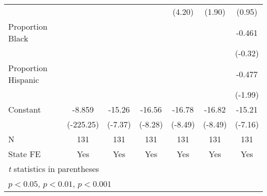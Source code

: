 {\begin{tabular}{l*{6}{c}}
                    &                     &                     &                     &      (4.20)         &      (1.90)         &      (0.95)         \\
\addlinespace
Proportion Black    &                     &                     &                     &                     &                     &      -0.461         \\
                    &                     &                     &                     &                     &                     &     (-0.32)         \\
\addlinespace
Proportion Hispanic &                     &                     &                     &                     &                     &      -0.477\sym{*}  \\
                    &                     &                     &                     &                     &                     &     (-1.99)         \\
\addlinespace
Constant            &      -8.859\sym{***}&      -15.26\sym{***}&      -16.56\sym{***}&      -16.78\sym{***}&      -16.82\sym{***}&      -15.21\sym{***}\\
                    &   (-225.25)         &     (-7.37)         &     (-8.28)         &     (-8.49)         &     (-8.49)         &     (-7.16)         \\
\midrule
N                   &         131         &         131         &         131         &         131         &         131         &         131         \\
State FE            &         Yes         &         Yes         &         Yes         &         Yes         &         Yes         &         Yes         \\
\bottomrule
\multicolumn{7}{l}{\footnotesize \textit{t} statistics in parentheses}\\
\multicolumn{7}{l}{\footnotesize \sym{*} \(p<0.05\), \sym{**} \(p<0.01\), \sym{***} \(p<0.001\)}\\
\end{tabular}
}
